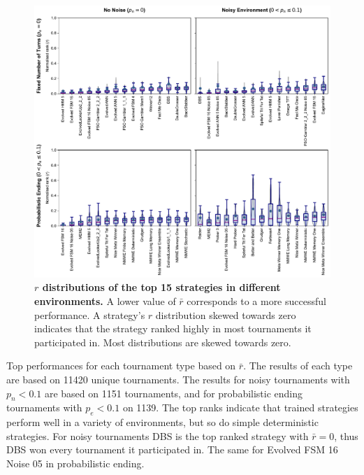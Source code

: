 \documentclass{article}
\begin{document}
\begin{figure}[!htbp]
    \centering
    \includegraphics[width=\textwidth]{../images/top_performers.pdf}
    \caption{\textbf{\(r\) distributions of the top 15 strategies in different
    environments.} A lower value of \(\bar{r}\) corresponds to a more successful
    performance. A strategy's \(r\) distribution skewed towards zero indicates
    that the strategy ranked highly in most tournaments it participated in. Most
    distributions are skewed towards zero.}\label{fig:r_distributions}
\end{figure}

\begin{table}[!htbp]
    \begin{center}
    \resizebox{\textwidth}{!}{
        
    }
\end{center}
\caption{Top performances for each tournament type based on $\bar{r}$. The
results of each type are based on 11420 unique tournaments. The
results for noisy tournaments with \(p_n < 0.1\) are based on 1151 tournaments,
and for probabilistic ending tournaments with \(p_e < 0.1\) on 1139. The top
ranks indicate that trained strategies perform well in a variety of
environments, but so do simple deterministic strategies. For noisy tournaments
DBS is the top ranked strategy with \(\bar{r}=0\), thus DBS won every tournament
it participated in. The same for Evolved FSM 16 Noise 05 in probabilistic ending.}
\label{table:top_performances}
\end{table}
\end{document}

